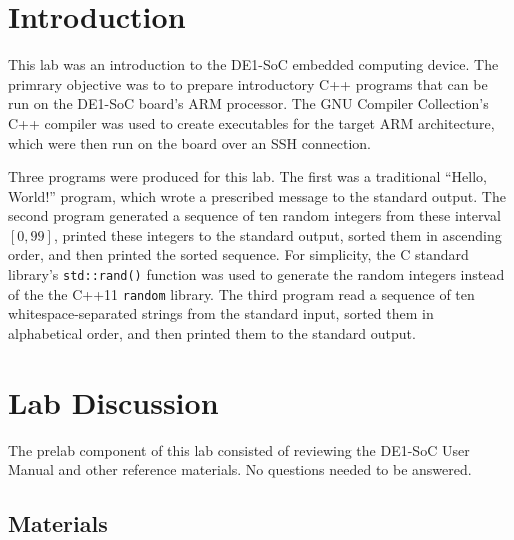 \documentclass[11pt, letterpaper]{article} %
\begin{document}
\makelabtitle

\section*{Introduction}

This lab was an introduction to the DE1-SoC embedded computing device. The primrary objective was to to prepare introductory C++ programs that can be run on the DE1-SoC board's ARM processor. The GNU Compiler Collection's C++ compiler was used to create executables for the target ARM architecture, which were then run on the board over an SSH connection.

Three programs were produced for this lab. The first was a traditional ``Hello, World!'' program, which wrote a prescribed message to the standard output. The second program generated a sequence of ten random integers from these interval $[0, 99]$, printed these integers to the standard output, sorted them in ascending order, and then printed the sorted sequence. For simplicity, the C standard library's \texttt{std::rand()} function was used to generate the random integers instead of the the C++11 \texttt{random} library. The third program read a sequence of ten whitespace-separated strings from the standard input, sorted them in alphabetical order, and then printed them to the standard output.

%
%
%

\section*{Lab Discussion}

The prelab component of this lab consisted of reviewing the DE1-SoC User Manual \cite{de1-soc-linux-manual} and other reference materials. No questions needed to be answered.

\subsection*{Materials}
\end{document}

